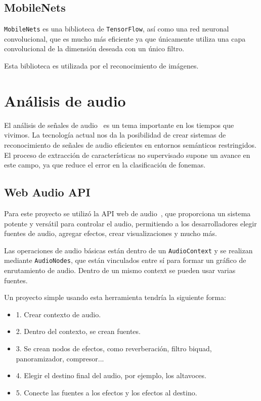 \documentclass[a4paper, 12pt]{book}
\begin{document}
\subsection{MobileNets}
\label{subsec:mobilenets}

\texttt{MobileNets} es una biblioteca de \texttt{TensorFlow}, así como una red neuronal convolucional, que es mucho más eficiente ya que únicamente utiliza una capa convolucional de la dimensión deseada con un único filtro.

Esta biblioteca es utilizada por el reconocimiento de imágenes.

\section{Análisis de audio}
\label{sec:analisis-audio}

El análisis de señales de audio~\cite{gonzalez2019analisis} es un tema importante en los tiempos que vivimos. La tecnología actual nos da la posibilidad de crear sistemas de reconocimiento de señales de audio eficientes en entornos semánticos restringidos. El proceso de extracción de características no supervisado supone un avance en este campo, ya que reduce el error en la clasificación de fonemas.

\subsection{Web Audio API}
\label{subsec:audio-api}

Para este proyecto se utilizó la API web de audio~\cite{web-audio-api}, que proporciona un sistema potente y versátil para controlar el audio, permitiendo a los desarrolladores elegir fuentes de audio, agregar efectos, crear visualizaciones y mucho más.

Las operaciones de audio básicas están dentro de un \texttt{AudioContext} y se realizan mediante \texttt{AudioNodes}, que están vinculados entre sí para formar un gráfico de enrutamiento de audio. Dentro de un mismo context se pueden usar varias fuentes.

Un proyecto simple usando esta herramienta tendría la siguiente forma:

\begin{itemize}
	\item 1. Crear contexto de audio.
	\item 2. Dentro del contexto, se crean fuentes.
	\item 3. Se crean nodos de efectos, como reverberación, filtro biquad, panoramizador, compresor...
	\item 4. Elegir el destino final del audio, por ejemplo, los altavoces.
	\item 5. Conecte las fuentes a los efectos y los efectos al destino.
\end{itemize}
\end{document}

